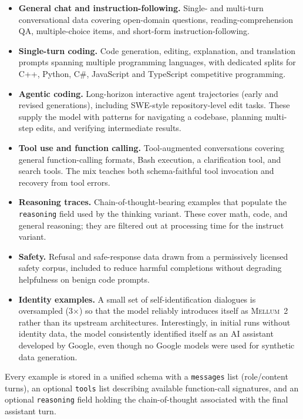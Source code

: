 \documentclass{llmxive}
\providecommand{\modelname}{\textsc{Mellum~2}\xspace}
\begin{document}
\begin{itemize}
  \item \textbf{General chat and instruction-following.} Single- and
    multi-turn conversational data covering open-domain questions,
    reading-comprehension QA, multiple-choice items, and short-form
    instruction-following. 
  \item \textbf{Single-turn coding.} Code generation, editing, explanation,
    and translation prompts spanning multiple programming languages, with
    dedicated splits for C++, Python, C\#, JavaScript and TypeScript competitive programming.
  \item \textbf{Agentic coding.} Long-horizon interactive agent trajectories
    (early and revised generations), including SWE-style repository-level edit tasks. These supply
    the model with patterns for navigating a codebase, planning multi-step
    edits, and verifying intermediate results.
  \item \textbf{Tool use and function calling.} Tool-augmented
    conversations covering general function-calling formats, Bash execution, a
    clarification tool, and search tools. The mix
    teaches both schema-faithful tool invocation and recovery from tool
    errors.
  \item \textbf{Reasoning traces.} Chain-of-thought-bearing examples that
    populate the \texttt{reasoning} field used by the thinking variant.
    These cover math, code, and general reasoning; they are filtered out at
    processing time for the instruct variant.
  \item \textbf{Safety.} Refusal and safe-response data drawn from a
    permissively licensed safety corpus, included to reduce harmful
    completions without degrading helpfulness on benign code prompts.
  \item \textbf{Identity examples.} A small set of self-identification dialogues is
    oversampled (3$\times$) so that the model reliably introduces itself as
    \modelname rather than its upstream architectures. Interestingly, in initial runs without identity data, the model consistently identified itself as an AI assistant developed by Google, even though no Google models were used for synthetic data generation.
\end{itemize}

Every example is stored in a unified schema with a \texttt{messages} list
(role/content turns), an optional \texttt{tools} list describing available
function-call signatures, and an optional \texttt{reasoning} field holding
the chain-of-thought associated with the final assistant turn.
\end{document}
